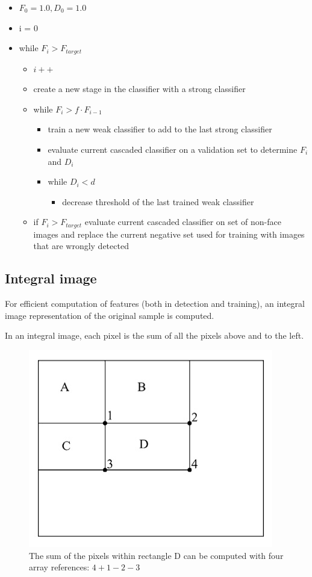 \documentclass[a4paper,11pt,titlepage]{article}
\begin{document}
\begin{itemize}
  \item $F_{0} = 1.0, D_{0} = 1.0$
  \item i = 0
  \item while $F_{i} > F_{target}$
    \begin{itemize}
      \item $i++$
      \item create a new stage in the classifier with a strong classifier
      \item while $F_{i} > f \cdot F_{i-1}$
        \begin{itemize}
          \item train a new weak classifier to add to the last strong classifier
          \item evaluate current cascaded classifier on a validation set to
            determine $F_{i}$ and $D_{i}$
          \item while $D_{i} < d$
            \begin{itemize}
              \item decrease threshold of the last trained weak classifier
            \end{itemize}
        \end{itemize}
      \item if $F_{i} > F_{target}$ evaluate current cascaded classifier on set
        of non-face images and replace the current negative set used for
        training with images that are wrongly detected
    \end{itemize}
\end{itemize}

\subsection{Integral image}
For efficient computation of features (both in detection and training), an
integral image representation of the original sample is computed.

In an integral image, each pixel is the sum of all the pixels above and to the
left.

\begin{figure}[h]
  \centering
  \includegraphics[scale=0.5]{area_sum_integral_image.jpg}
  \caption{The sum of the pixels within rectangle D can be computed with four
  array references: $4+1-2-3$}
  \label{fig:area_sum}
\end{figure}
\end{document}
